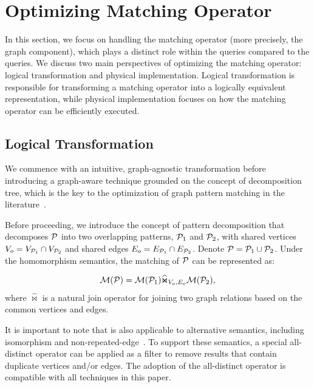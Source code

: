 
\section{Optimizing Matching Operator}
\label{sec:optimizing-matching-operator}
In this section, we focus on handling the matching operator (more precisely, the graph component),
which plays a distinct role within the \spjm queries compared to the \spj queries. We discuss two main perspectives of optimizing
the matching operator: logical transformation and physical implementation. Logical transformation is
responsible for transforming a matching operator into a logically equivalent representation,
while physical implementation focuses on how the matching operator can be efficiently executed.

\subsection{Logical Transformation}
\label{sec:handling-match-operator}
We commence with an intuitive, graph-agnostic transformation before
introducing a graph-aware technique grounded on the concept of decomposition tree, which
is the key to the optimization of graph pattern matching in the literature~\cite{huge,GLogS}.

Before proceeding, we introduce the concept of pattern decomposition that decomposes $\mathcal{P}$ into two overlapping patterns, $\mathcal{P}_1$ and $\mathcal{P}_2$, with shared vertices $V_{o} = V_{\mathcal{P}_1} \cap V_{\mathcal{P}_2}$ and shared edges $E_{o} = E_{\mathcal{P}_1} \cap E_{\mathcal{P}_2}$.
Denote $\mathcal{P} = \mathcal{P}_1 \cup \mathcal{P}_2$. Under the homomorphism semantics, the matching of $\mathcal{P}$ can be represented as:

\begin{equation}
    \label{eq:join-pattern}
    \mathcal{M}(\mathcal{P}) = \mathcal{M}(\mathcal{P}_1) \widehat{\Join}_{V_{o}, E_{o}} \mathcal{M}(\mathcal{P}_2),
\end{equation}
where $\widehat{\Join}$ is a natural join operator for joining two graph relations based on the common vertices and edges.

It is important to note that  is also applicable to alternative semantics, including isomorphism and non-repeated-edge~\cite{angles2017foundations}. To support these semantics, a special all-distinct operator can be applied as a filter to remove results that contain duplicate vertices and/or edges. The adoption of the all-distinct operator is compatible with all techniques in this paper.

